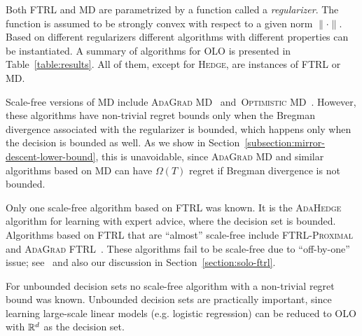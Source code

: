 Both \textsc{FTRL} and \textsc{MD} are parametrized by a function called a
\emph{regularizer}. The function is assumed to be strongly convex with respect
to a given norm $\|\cdot\|$. Based on different regularizers different
algorithms with different properties can be instantiated. A summary of
algorithms for OLO is presented in Table~\ref{table:results}.  All of them,
except for \textsc{Hedge}, are instances of \textsc{FTRL} or \textsc{MD}.

Scale-free versions of \textsc{MD} include \textsc{AdaGrad
MD}~\cite{Duchi-Hazan-Singer-2011} and~\textsc{Optimistic
MD}~\cite{Rakhlin-Sridharan-2013}. However, these algorithms have non-trivial
regret bounds only when the Bregman divergence associated with the regularizer
is bounded, which happens only when the decision is bounded as well. As we show
in Section~\ref{subsection:mirror-descent-lower-bound}, this is unavoidable,
since \textsc{AdaGrad MD} and similar algorithms based on \textsc{MD} can have
$\Omega(T)$ regret if Bregman divergence is not bounded.

Only one scale-free algorithm based on \textsc{FTRL} was known. It is the
\textsc{AdaHedge}~\cite{de-Rooij-van-Erven-Grunwald-Koolen-2014} algorithm for
learning with expert advice, where the decision set is bounded.
Algorithms based on \textsc{FTRL} that are ``almost'' scale-free include
\textsc{FTRL-Proximal}~\cite{McMahan-Streeter-2010,McMahan-2014} and
\textsc{AdaGrad FTRL}~\cite{Duchi-Hazan-Singer-2011}.  These algorithms fail to
be scale-free due to ``off-by-one'' issue; see~\cite{McMahan-2014} and also our
discussion in Section~\ref{section:solo-ftrl}.

For unbounded decision sets no scale-free algorithm with a non-trivial regret
bound was known. Unbounded decision sets are practically important, since
learning large-scale linear models (e.g. logistic regression) can be reduced to
OLO with $\mathbb{R}^d$ as the decision set.


